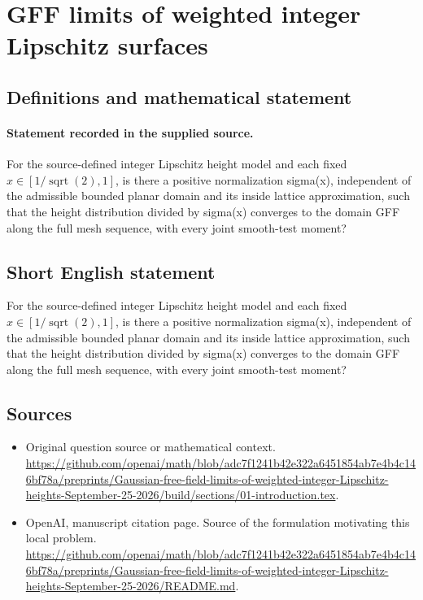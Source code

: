 \documentclass[11pt]{article}
\begin{document}
\section*{GFF limits of weighted integer Lipschitz surfaces}\label{30007413}
\subsection{Definitions and mathematical statement}
\paragraph{Statement recorded in the supplied source.}
For the source-defined integer Lipschitz height model and each fixed $x\in [1/\operatorname{sqrt}(2),1]$, is there a positive normalization sigma(x), independent of the admissible bounded planar domain and its inside lattice approximation, such that the height distribution divided by sigma(x) converges to the domain GFF along the full mesh sequence, with every joint smooth-test moment?
\subsection{Short English statement}
For the source-defined integer Lipschitz height model and each fixed $x\in [1/\operatorname{sqrt}(2),1]$, is there a positive normalization sigma(x), independent of the admissible bounded planar domain and its inside lattice approximation, such that the height distribution divided by sigma(x) converges to the domain GFF along the full mesh sequence, with every joint smooth-test moment?
\subsection{Sources}
\begin{itemize}
\item[S1] Original question source or mathematical context.
\url{https://github.com/openai/math/blob/adc7f1241b42e322a6451854ab7e4b4c146bf78a/preprints/Gaussian-free-field-limits-of-weighted-integer-Lipschitz-heights-September-25-2026/build/sections/01-introduction.tex}.
\item[S2] OpenAI, manuscript citation page. Source of the formulation motivating this local problem.
\url{https://github.com/openai/math/blob/adc7f1241b42e322a6451854ab7e4b4c146bf78a/preprints/Gaussian-free-field-limits-of-weighted-integer-Lipschitz-heights-September-25-2026/README.md}.
\end{itemize}
\end{document}
